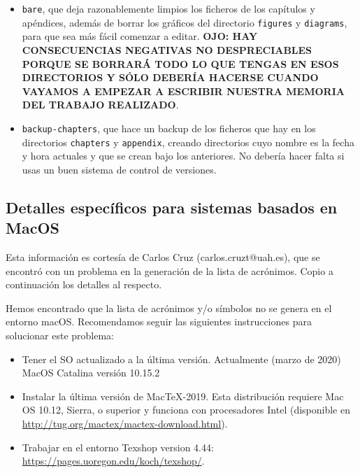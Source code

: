 \documentclass[spanish,openright]{book}
\begin{document}
\begin{itemize}
\begin{itemize}
  \item \texttt{bare}, que deja razonablemente limpios los ficheros de
    los capítulos y apéndices, además de borrar los gráficos del
    directorio \texttt{figures} y \texttt{diagrams}, para que sea más
    fácil comenzar a editar. \textbf{OJO: HAY CONSECUENCIAS NEGATIVAS NO
      DESPRECIABLES PORQUE SE BORRARÁ TODO LO QUE TENGAS EN ESOS
      DIRECTORIOS Y SÓLO DEBERÍA HACERSE CUANDO VAYAMOS A EMPEZAR A
      ESCRIBIR NUESTRA MEMORIA DEL TRABAJO REALIZADO}.

  \item \texttt{backup-chapters}, que hace un backup de los ficheros que
    hay en los directorios \texttt{chapters} y \texttt{appendix},
    creando directorios cuyo nombre es la fecha y hora actuales y que se
    crean bajo los anteriores. No debería hacer falta si usas un buen
    sistema de control de versiones.
  \end{itemize}

\end{itemize}


\subsection{Detalles específicos para sistemas basados en MacOS}
\label{sec:detall-espec-para}

Esta información es cortesía de Carlos Cruz (carlos.cruzt@uah.es), que
se encontró con un problema en la generación de la lista de
acrónimos. Copio a continuación los detalles al respecto.

Hemos encontrado que la lista de acrónimos y/o símbolos no se genera en
el entorno macOS. Recomendamos seguir las siguientes instrucciones para
solucionar este problema:

\begin{itemize}
\item Tener el SO actualizado a la última versión. Actualmente (marzo de
  2020) MacOS Catalina versión 10.15.2
\item Instalar la última versión de MacTeX-2019. Esta distribución
  requiere Mac OS 10.12, Sierra, o superior y funciona con procesadores
  Intel (disponible en
  \href{http://tug.org/mactex/mactex-download.html}{http://tug.org/mactex/mactex-download.html}).
\item Trabajar en el entorno Texshop version 4.44:
  \href{https://pages.uoregon.edu/koch/texshop/}{https://pages.uoregon.edu/koch/texshop/}.
\end{itemize}
\end{document}
